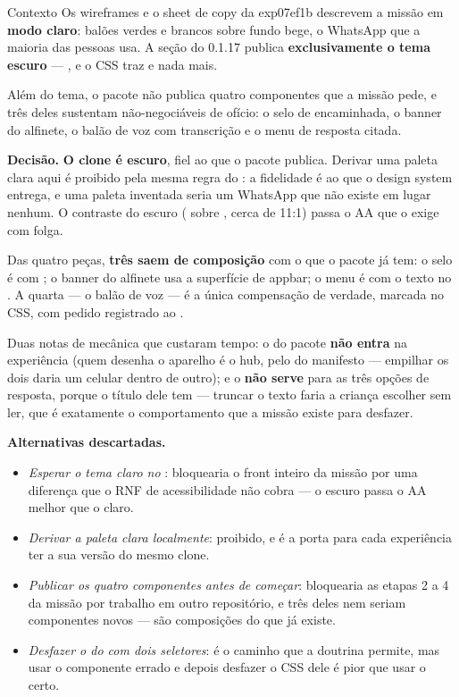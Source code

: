\begin{especificacao}{Contexto}
Os wireframes e o sheet de copy da exp07ef1b descrevem a missão em \textbf{modo
claro}: balões verdes e brancos sobre fundo bege, o WhatsApp que a maioria das
pessoas usa. A seção  do  0.1.17
publica \textbf{exclusivamente o tema escuro} --- , e o CSS
traz  e nada mais.

Além do tema, o pacote não publica quatro componentes que a missão pede, e três
deles sustentam não-negociáveis de ofício: o selo de encaminhada, o banner do
alfinete, o balão de voz com transcrição e o menu de resposta citada.
\end{especificacao}

\textbf{Decisão.} \textbf{O clone é escuro}, fiel ao que o pacote publica.
Derivar uma paleta clara aqui é proibido pela mesma regra do : a
fidelidade é ao que o design system entrega, e uma paleta inventada seria um
WhatsApp que não existe em lugar nenhum. O contraste do escuro
( sobre , cerca de 11:1) passa o AA que o
 exige com folga.

Das quatro peças, \textbf{três saem de composição} com o que o pacote já tem: o
selo é  com ; o banner do alfinete usa a
superfície de appbar; o menu é  com o texto no . A quarta
--- o balão de voz --- é a única compensação de verdade, marcada
 no CSS, com pedido registrado ao .

Duas notas de mecânica que custaram tempo: o  do pacote
\textbf{não entra} na experiência (quem desenha o aparelho é o hub, pelo
 do manifesto --- empilhar os dois daria um celular dentro de
outro); e o  \textbf{não serve} para as três opções de resposta,
porque o título dele tem  --- truncar o texto faria a
criança escolher sem ler, que é exatamente o comportamento que a missão existe
para desfazer.

\textbf{Alternativas descartadas.}
\begin{itemize}
  \item \emph{Esperar o tema claro no }: bloquearia o
    front inteiro da missão por uma diferença que o RNF de acessibilidade não
    cobra --- o escuro passa o AA melhor que o claro.
  \item \emph{Derivar a paleta clara localmente}: proibido, e é a porta para
    cada experiência ter a sua versão do mesmo clone.
  \item \emph{Publicar os quatro componentes antes de começar}: bloquearia as
    etapas 2 a 4 da missão por trabalho em outro repositório, e três deles nem
    seriam componentes novos --- são composições do que já existe.
  \item \emph{Desfazer o  do  com dois seletores}: é o
    caminho que a doutrina permite, mas usar o componente errado e depois
    desfazer o CSS dele é pior que usar o certo.
\end{itemize}

